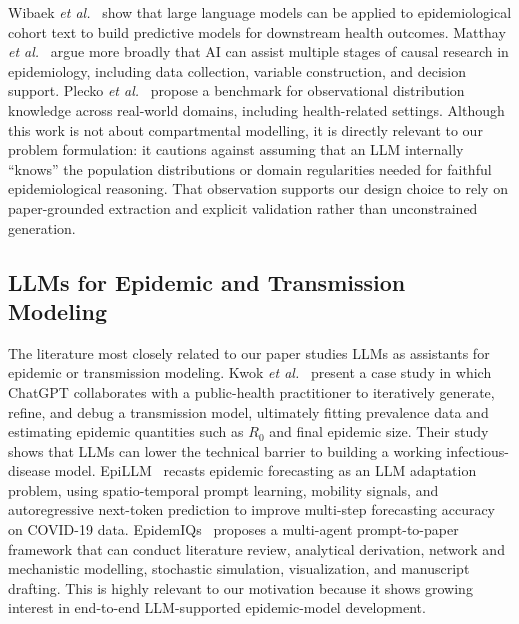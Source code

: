 Wibaek \emph{et al.}~\cite{wibaek2023llm_epidemiology}
show that large language models can be applied to epidemiological cohort text to build
predictive models for downstream health outcomes. Matthay \emph{et al.}~\cite{Matthay2025}
argue more broadly that AI can assist multiple stages of causal research in epidemiology,
including data collection, variable construction, and decision support. Plecko \emph{et al.}~\cite{plecko2025epidemiologyllm} propose a benchmark for
observational distribution knowledge across real-world domains, including health-related
settings. Although this work is not about compartmental modelling, it is directly relevant to
our problem formulation: it cautions against assuming that an LLM internally ``knows'' the
population distributions or domain regularities needed for faithful epidemiological reasoning.
That observation supports our design choice to rely on paper-grounded extraction and explicit
validation rather than unconstrained generation.

\subsection{LLMs for Epidemic and Transmission Modeling}

The literature most closely related to our paper studies LLMs as assistants for epidemic or
transmission modeling. Kwok \emph{et al.}~\cite{KWOK20243254} present a case study in which
ChatGPT collaborates with a public-health practitioner to iteratively generate, refine, and
debug a transmission model, ultimately fitting prevalence data and estimating epidemic
quantities such as $R_0$ and final epidemic size. Their study shows
that LLMs can lower the technical barrier to building a working infectious-disease model. EpiLLM~\cite{gong2025epillmunlockingpotentiallarge}
recasts epidemic forecasting as an LLM adaptation problem, using spatio-temporal prompt
learning, mobility signals, and autoregressive next-token prediction to improve multi-step
forecasting accuracy on COVID-19 data. EpidemIQs~\cite{samaei2026epidemiqsprompttopaperllmagents}
proposes a multi-agent prompt-to-paper framework that can conduct literature review,
analytical derivation, network and mechanistic modelling, stochastic simulation,
visualization, and manuscript drafting. This is highly relevant to our motivation because it
shows growing interest in end-to-end LLM-supported epidemic-model development.



